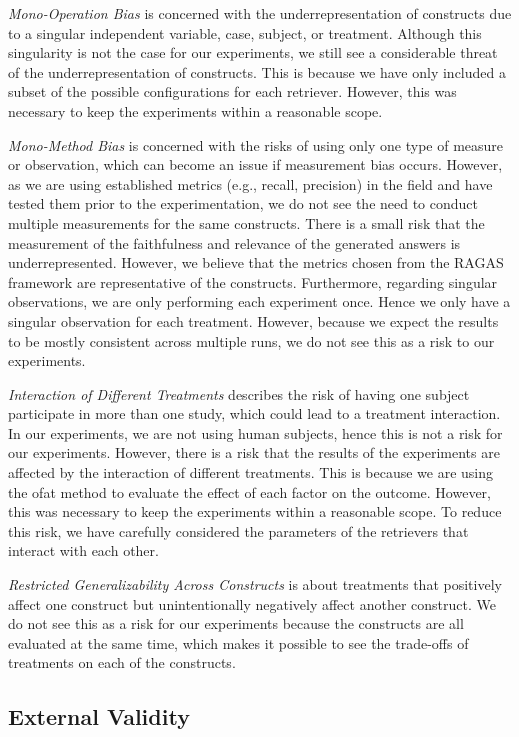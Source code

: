 \emph{Mono-Operation Bias} is concerned with the underrepresentation of constructs due to a singular independent variable, case, subject, or treatment. Although this singularity is not the case for our experiments, we still see a considerable threat of the underrepresentation of constructs. This is because we have only included a subset of the possible configurations for each retriever. However, this was necessary to keep the experiments within a reasonable scope. 

\emph{Mono-Method Bias} is concerned with the risks of using only one type of measure or observation, which can become an issue if measurement bias occurs. However, as we are using established metrics (e.g., recall, precision) in the field and have tested them prior to the experimentation, we do not see the need to conduct multiple measurements for the same constructs. There is a small risk that the measurement of the faithfulness and relevance of the generated answers is underrepresented. However, we believe that the metrics chosen from the RAGAS framework are representative of the constructs. Furthermore, regarding singular observations, we are only performing each experiment once. Hence we only have a singular observation for each treatment. However, because we expect the results to be mostly consistent across multiple runs, we do not see this as a risk to our experiments.

\emph{Interaction of Different Treatments} describes the risk of having one subject participate in more than one study, which could lead to a treatment interaction. In our experiments, we are not using human subjects, hence this is not a risk for our experiments. However, there is a risk that the results of the experiments are affected by the interaction of different treatments. This is because we are using the \gls{ofat} method to evaluate the effect of each factor on the outcome. However, this was necessary to keep the experiments within a reasonable scope. To reduce this risk, we have carefully considered the parameters of the retrievers that interact with each other.

\emph{Restricted Generalizability Across Constructs} is about treatments that positively affect one construct but unintentionally negatively affect another construct. We do not see this as a risk for our experiments because the constructs are all evaluated at the same time, which makes it possible to see the trade-offs of treatments on each of the constructs. 

\subsection{External Validity}

